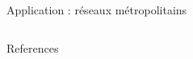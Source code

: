 \documentclass{beamer}
\begin{document}
\begin{frame}{}
\begin{columns}[t]
\begin{column}{.49\textwidth}
\begin{block}{Application : réseaux métropolitains}
\begin{columns}[t]
\begin{column}{.95\textwidth}
\begin{justify}
          \end{justify}
          \end{column}
          \end{columns}
        \end{block}


%          
        
        
        
      \end{column}
    \end{columns}
    
    
    \begin{block}{References}
        {\tiny
        \vspace{-1cm}
        \begin{multicols}{4}
          
          
        \end{multicols}
          }
        \end{block}
    
  \end{frame}
\end{document}
